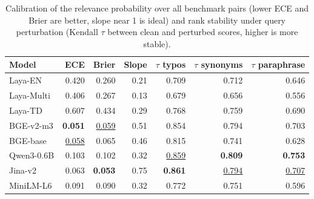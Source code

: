 \begin{table}[t]
\centering
\small
\caption{Calibration of the relevance probability over all benchmark pairs (lower ECE and Brier are better, slope near 1 is ideal) and rank stability under query perturbation (Kendall $\tau$ between clean and perturbed scores, higher is more stable).}
\label{tab:calibration}
\begin{tabular}{lrrrrrr}
\toprule
Model & ECE & Brier & Slope & $\tau$ typos & $\tau$ synonyms & $\tau$ paraphrase \\
\midrule
Laya-EN & 0.420 & 0.260 & 0.21 & 0.709 & 0.712 & 0.646 \\
Laya-Multi & 0.406 & 0.267 & 0.13 & 0.679 & 0.656 & 0.556 \\
Laya-TD & 0.607 & 0.434 & 0.29 & 0.768 & 0.759 & 0.690 \\
BGE-v2-m3 & \textbf{0.051} & \underline{0.059} & 0.51 & 0.854 & 0.794 & 0.703 \\
BGE-base & \underline{0.058} & 0.065 & 0.46 & 0.815 & 0.741 & 0.628 \\
Qwen3-0.6B & 0.103 & 0.102 & 0.32 & \underline{0.859} & \textbf{0.809} & \textbf{0.753} \\
Jina-v2 & 0.063 & \textbf{0.053} & 0.75 & \textbf{0.861} & \underline{0.794} & \underline{0.707} \\
MiniLM-L6 & 0.091 & 0.090 & 0.32 & 0.772 & 0.751 & 0.596 \\
\bottomrule
\end{tabular}
\end{table}
